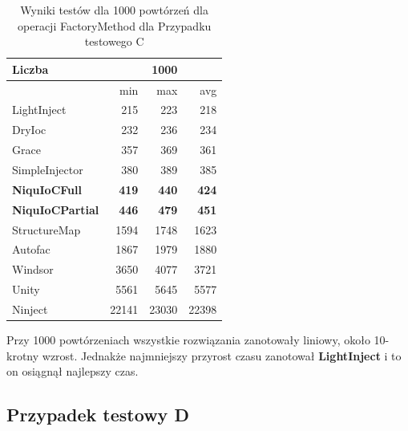 \documentclass[12pt]{article}
\begin{document}
\begin{table}[H]
\captionsetup{belowskip=0pt,aboveskip=0pt}
\begin{center}
\begin{small}
	\begin{tabular}{ | l | r r r | }
    		\hline
Liczba & & 1000 & \\ \hline
 & min & max & avg \\ \hline
LightInject & 215 & 223 & 218 \\ \hline
DryIoc & 232 & 236 & 234 \\ \hline
Grace & 357 & 369 & 361 \\ \hline
SimpleInjector & 380 & 389 & 385 \\ \hline
\textbf{NiquIoCFull} & \textbf{419} & \textbf{440} & \textbf{424} \\ \hline
\textbf{NiquIoCPartial} & \textbf{446} & \textbf{479} & \textbf{451} \\ \hline
StructureMap & 1594 & 1748 & 1623 \\ \hline
Autofac & 1867 & 1979 & 1880 \\ \hline
Windsor & 3650 & 4077 & 3721 \\ \hline
Unity & 5561 & 5645 & 5577 \\ \hline
Ninject & 22141 & 23030 & 22398 \\ \hline
  	\end{tabular}
\end{small}
\end{center}
\caption{Wyniki testów dla 1000 powtórzeń dla operacji FactoryMethod dla Przypadku testowego C}
\label{TestCaseC_FactoryMethod1000}
\end{table}
Przy 1000 powtórzeniach wszystkie rozwiązania zanotowały liniowy, około 10-krotny wzrost. Jednakże najmniejszy przyrost czasu zanotował \textbf{LightInject} i to on osiągnął najlepszy czas.


\subsection{Przypadek testowy D}
\end{document}
